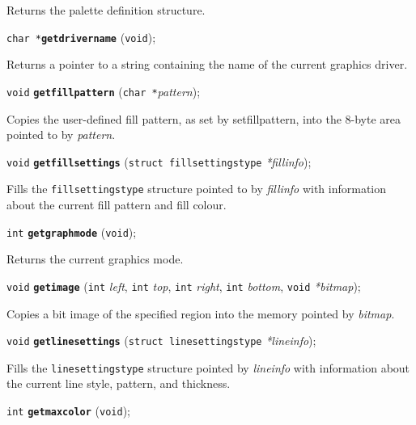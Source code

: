 \documentclass[a4paper,11pt]{article}
\newcommand{\V}{\texttt{void}}      %
\newcommand{\I}{\texttt{int}}       %
\newcommand{\C}{\texttt{char *}}    %
\newcommand{\func}[1]{\textbf{\texttt{#1}}}  %
\newcommand{\A}[1]{\emph{#1}}       %
\newenvironment{bgi}
{ %
  \begin{snugshade}
}
{ %
  \end{snugshade}
}
\begin{document}
Returns the palette definition structure.


\begin{bgi}
\C{}\func{getdrivername} (\V{});
\end{bgi}

Returns a pointer to a string containing the name of the current
graphics driver.


\begin{bgi}
\V{} \func{getfillpattern} (\C{}\A{pattern}); 
\end{bgi}

Copies the user-defined fill pattern, as set by setfillpattern, into
the 8-byte area pointed to by \A{pattern}.


\begin{bgi}
\V{} \func{getfillsettings} (\texttt{struct fillsettingstype}
\A{*fillinfo});
\end{bgi}

Fills the \texttt{fillsettingstype} structure pointed to by
\A{fillinfo} with information about the current fill pattern and fill
colour.


\begin{bgi}
\I{} \func{getgraphmode} (\V{});
\end{bgi}

Returns the current graphics mode.


\begin{bgi}
\V{} \func{getimage} (\I{} \A{left}, \I{} \A{top}, \I{} \A{right},
\I{} \A{bottom}, \V{} \A{*bitmap});
\end{bgi}

Copies a bit image of the specified region into the memory pointed by
\A{bitmap}.


\begin{bgi}
\V{} \func{getlinesettings} (\texttt{struct linesettingstype}
\A{*lineinfo});
\end{bgi}

Fills the \texttt{linesettingstype} structure pointed by \A{lineinfo}
with information about the current line style, pattern, and thickness.


\begin{bgi}
\I{} \func{getmaxcolor} (\V{});
\end{bgi}
\end{document}
